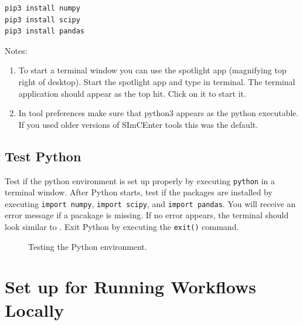 \begin{enumerate}
\begin{verbatim}
pip3 install numpy
pip3 install scipy
pip3 install pandas
\end{verbatim}

Notes: 
\begin{enumerate}
\item To start a terminal window you can use the spotlight app (magnifying top right of desktop). Start the spotlight app and type in terminal. The terminal application should appear as the top hit. Click on it to start it.
\item In tool preferences make sure that python3 appears as the python executable. If you used older versions of SImCEnter tools this was the default.
\end{enumerate}
\end{enumerate}

\subsection{Test Python}

Test if the python environment is set up properly by
executing \texttt{python} in a terminal window. After Python starts,
test if the packages are installed by executing \texttt{import
numpy}, \texttt{import scipy}, and \texttt{import pandas}. You will
receive an error message if a pacakage is missing. If no error
appears, the terminal should look similar
to . Exit Python by executing
the \texttt{exit()} command.

\begin{figure}[!htbp]
  \caption{Testing the Python environment.}
  \label{fig:python_test}
\end{figure}

\section{Set up for Running Workflows Locally}\label{setup}

